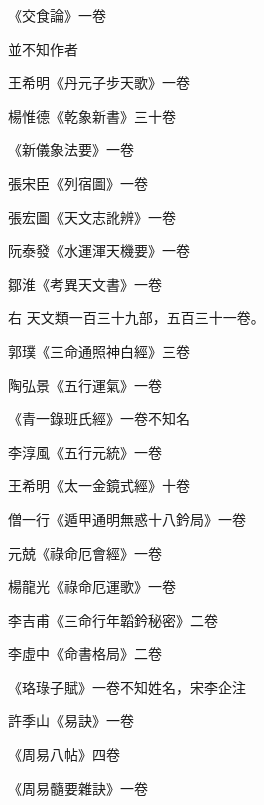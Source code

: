 \begin{pinyinscope}
 《交食論》一卷



 並不知作者



 王希明《丹元子步天歌》一卷



 楊惟德《乾象新書》三十卷



 《新儀象法要》一卷



 張宋臣《列宿圖》一卷



 張宏圖《天文志訛辨》一卷



 阮泰發《水運渾天機要》一卷



 鄒淮《考異天文書》一卷



 右
 天文類一百三十九部，五百三十一卷。



 郭璞《三命通照神白經》三卷



 陶弘景《五行運氣》一卷



 《青一錄班氏經》一卷不知名



 李淳風《五行元統》一卷



 王希明《太一金鏡式經》十卷



 僧一行《遁甲通明無惑十八鈐局》一卷



 元兢《祿命厄會經》一卷



 楊龍光《祿命厄運歌》一卷



 李吉甫《三命行年韜鈐秘密》二卷



 李虛中《命書格局》二卷



 《珞琭子賦》一卷不知姓名，宋李企注



 許季山《易訣》一卷



 《周易八帖》四卷



 《周易髓要雜訣》一卷




\end{pinyinscope}
